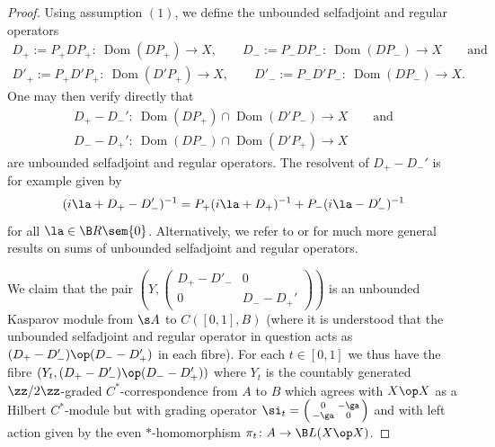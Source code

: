 \begin{proof}
Using assumption $(1)$, we define the unbounded selfadjoint and regular operators
\begin{gather*}
D_+ := P_+ D P_+\colon \ \operatorname{Dom}(D P_+) \to X , \qquad D_- := P_- D P_-\colon \ \operatorname{Dom}(D P_-) \to X \qquad \text{and} \\
D'_+ := P_+ D' P_+\colon \ \operatorname{Dom}(D' P_+) \to X , \qquad D'_- := P_- D' P_-\colon \ \operatorname{Dom}(D P_-) \to X .
\end{gather*}
One may then verify directly that
\begin{gather*}
 D_+ - D_-'\colon \ \operatorname{Dom}(D P_+) \cap \operatorname{Dom}(D' P_-) \to X \qquad \text{and} \\
 D_- - D_+'\colon \ \operatorname{Dom}(D P_-) \cap \operatorname{Dom}(D' P_+) \to X
\end{gather*}
are unbounded selfadjoint and regular operators. The resolvent of $D_+ - D_-'$ is for example given by
\[
(i \la + D_+ - D_-')^{-1} = P_+ ( i \la + D_+)^{-1} + P_- (i\la - D_-')^{-1}
\]
for all $\la \in \B R \sem \{0\}$. Alternatively, we refer to \cite[Section~7]{KaLe:LGR} or \cite[Theorem~4.5]{LeMe:SSH} for much more general results on sums of unbounded selfadjoint and regular operators.

We claim that the pair $\left(Y, \left(\begin{smallmatrix} D_+ - D'_- & 0 \\ 0 & D_- - D_+' \end{smallmatrix}\right)\right)$ is an unbounded Kasparov module from $\s A$ to $C( [0,1], B)$ (where it is understood that the unbounded selfadjoint and regular operator in question acts as $( D_+ - D_-') \op (D_- - D_+')$ in each fibre). For each $t \in [0,1]$ we thus have the fibre $(Y_t, ( D_+ - D_-') \op (D_- - D_+'))$ where $Y_t$ is the countably generated $\zz/2\zz$-graded $C^*$-correspondence from $A$ to $B$ which agrees with $X \op X$ as a Hilbert $C^*$-module but with grading operator $\si_t = \left(\begin{smallmatrix}0 & -\ga \\ -\ga & 0\end{smallmatrix}\right)$ and with left action given by the even $*$-homomorphism $\pi_t\colon A \to \B L(X \op X)$.


\end{proof}
